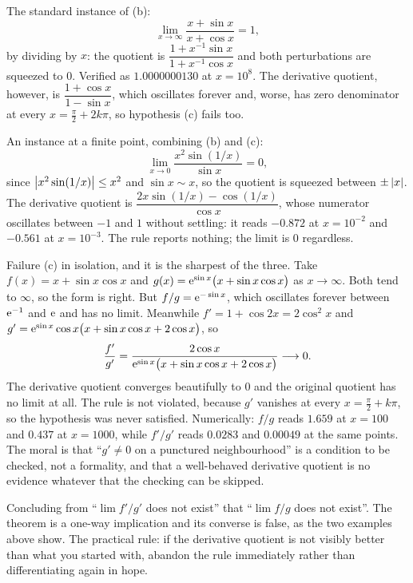 \begin{worked}
The standard instance of (b):
\[
\lim_{x\to\infty}\frac{x+\sin x}{x+\cos x}=1,
\]
by dividing by $x$: the quotient is $\dfrac{1+x^{-1}\sin x}{1+x^{-1}\cos x}$ and both perturbations are squeezed to $0$. Verified as $1.0000000130$ at $x=10^{8}$. The derivative quotient, however, is $\dfrac{1+\cos x}{1-\sin x}$, which oscillates forever and, worse, has zero denominator at every $x=\tfrac{\pi}{2}+2k\pi$, so hypothesis (c) fails too.

An instance at a finite point, combining (b) and (c):
\[
\lim_{x\to0}\frac{x^{2}\sin(1/x)}{\sin x}=0,
\]
since $\left\lvert x^{2}\sin(1/x)\right\rvert\leq x^{2}$ and $\sin x\sim x$, so the quotient is squeezed between $\pm\left\lvert x\right\rvert$. The derivative quotient is $\dfrac{2x\sin(1/x)-\cos(1/x)}{\cos x}$, whose numerator oscillates between $-1$ and $1$ without settling: it reads $-0.872$ at $x=10^{-2}$ and $-0.561$ at $x=10^{-3}$. The rule reports nothing; the limit is $0$ regardless.

Failure (c) in isolation, and it is the sharpest of the three. Take $f(x)=x+\sin x\cos x$ and $g(x)=\mathrm{e}^{\sin x}\bigl(x+\sin x\cos x\bigr)$ as $x\to\infty$. Both tend to $\infty$, so the form is right. But $f/g=\mathrm{e}^{-\sin x}$, which oscillates forever between $\mathrm{e}^{-1}$ and $\mathrm{e}$ and has no limit. Meanwhile $f'=1+\cos2x=2\cos^{2}x$ and $g'=\mathrm{e}^{\sin x}\cos x\bigl(x+\sin x\cos x+2\cos x\bigr)$, so
\[
\frac{f'}{g'}=\frac{2\cos x}{\mathrm{e}^{\sin x}\bigl(x+\sin x\cos x+2\cos x\bigr)}\longrightarrow 0 .
\]
The derivative quotient converges beautifully to $0$ and the original quotient has no limit at all. The rule is not violated, because $g'$ vanishes at every $x=\tfrac{\pi}{2}+k\pi$, so the hypothesis was never satisfied. Numerically: $f/g$ reads $1.659$ at $x=100$ and $0.437$ at $x=1000$, while $f'/g'$ reads $0.0283$ and $0.00049$ at the same points. The moral is that ``$g'\neq0$ on a punctured neighbourhood'' is a condition to be checked, not a formality, and that a well-behaved derivative quotient is no evidence whatever that the checking can be skipped.
\end{worked}

\begin{trap}
Concluding from ``$\lim f'/g'$ does not exist'' that ``$\lim f/g$ does not exist''. The theorem is a one-way implication and its converse is false, as the two examples above show. The practical rule: if the derivative quotient is not visibly better than what you started with, abandon the rule immediately rather than differentiating again in hope.
\end{trap}

